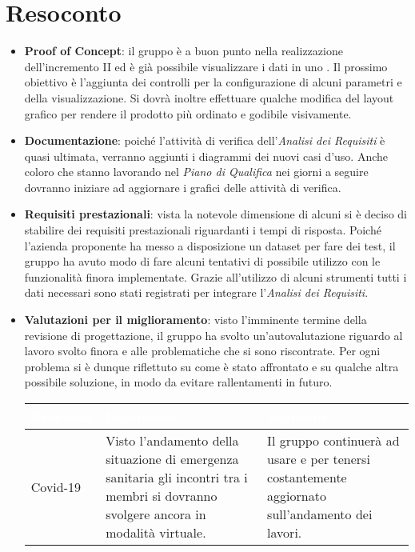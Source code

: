 \section{Resoconto}
\begin{itemize}
\item \textbf{Proof of Concept}: il gruppo è a buon punto nella realizzazione dell'incremento II ed è già possibile visualizzare i dati in uno . Il prossimo obiettivo è l'aggiunta dei controlli per la configurazione di alcuni parametri e della visualizzazione. Si dovrà inoltre effettuare qualche modifica del layout grafico per rendere il prodotto più ordinato e godibile visivamente. 

\item\textbf{Documentazione}: poiché l'attività di verifica dell'\textit{Analisi dei Requisiti} è quasi ultimata, verranno aggiunti i diagrammi dei nuovi casi d'uso. Anche coloro che stanno lavorando nel \textit{Piano di Qualifica} nei giorni a seguire dovranno iniziare ad aggiornare i grafici delle attività di verifica.

\item \textbf{Requisiti prestazionali}: vista la notevole dimensione di alcuni  si è deciso di stabilire dei requisiti prestazionali riguardanti i tempi di risposta. Poiché l'azienda proponente ha messo a disposizione un dataset per fare dei test, il gruppo ha avuto modo di fare alcuni tentativi di possibile utilizzo con le funzionalità finora implementate. Grazie all'utilizzo di alcuni strumenti tutti i dati necessari sono stati registrati per integrare l'\textit{Analisi dei Requisiti}.

\item\textbf{Valutazioni per il miglioramento}: visto l'imminente termine della revisione di progettazione, il gruppo ha svolto un'autovalutazione riguardo al lavoro svolto finora e alle problematiche che si sono riscontrate. Per ogni problema si è dunque riflettuto su come è stato affrontato e su qualche altra possibile soluzione, in modo da evitare rallentamenti in futuro.

\renewcommand{\arraystretch}{1.5}
\centering
\begin{longtable}{C{3cm} C{6cm} C{6cm}}
\textcolor{white}{\textbf{Problema}} &
\textcolor{white}{\textbf{Descrizione}} &	
\textcolor{white}{\textbf{Soluzione}} \\	
\endhead

Covid-19 &
Visto l'andamento della situazione di emergenza sanitaria gli incontri tra i membri si dovranno svolgere ancora in modalità virtuale.&
Il gruppo continuerà ad usare  e  per tenersi costantemente aggiornato sull'andamento dei lavori. \\


\end{longtable}
\end{itemize}
